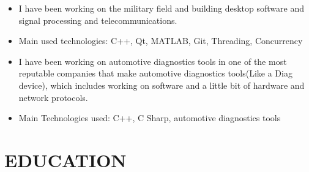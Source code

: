 \documentclass[11pt,a4paper,roman]{moderncv}
\begin{document}
{
{\begin{itemize}
  \item  I have been working on the military field and building desktop software and signal processing and telecommunications.
\item Main used technologies: C++, Qt, MATLAB, Git, Threading, Concurrency
\end{itemize}
}
}

{
{\begin{itemize}
  \item  I have been working on automotive diagnostics tools in one of the most reputable companies that make automotive diagnostics tools(Like a Diag device), which includes working on software and a little bit of hardware and network protocols.
\item Main  Technologies used: C++, C Sharp, automotive diagnostics tools
\end{itemize}
}
}



\section{EDUCATION}



\end{document}
